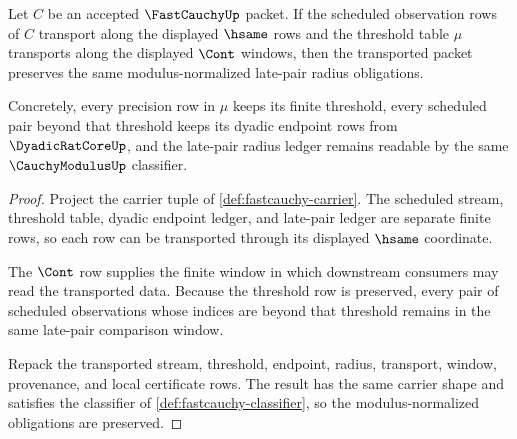 \begin{theorem}
\label{thm:fastcauchy-modulus-transport}
Let $C$ be an accepted $\FastCauchyUp$ packet. If the scheduled observation rows of $C$ transport along the displayed $\hsame$ rows and the threshold table $\mu$ transports along the displayed $\Cont$ windows, then the transported packet preserves the same modulus-normalized late-pair radius obligations.

Concretely, every precision row in $\mu$ keeps its finite threshold, every scheduled pair beyond that threshold keeps its dyadic endpoint rows from $\DyadicRatCoreUp$, and the late-pair radius ledger remains readable by the same $\CauchyModulusUp$ classifier.
\end{theorem}
\begin{proof}
Project the carrier tuple of \autoref{def:fastcauchy-carrier}. The scheduled stream, threshold table, dyadic endpoint ledger, and late-pair ledger are separate finite rows, so each row can be transported through its displayed $\hsame$ coordinate.

The $\Cont$ row supplies the finite window in which downstream consumers may read the transported data. Because the threshold row is preserved, every pair of scheduled observations whose indices are beyond that threshold remains in the same late-pair comparison window.

Repack the transported stream, threshold, endpoint, radius, transport, window, provenance, and local certificate rows. The result has the same carrier shape and satisfies the classifier of \autoref{def:fastcauchy-classifier}, so the modulus-normalized obligations are preserved.
\end{proof}

